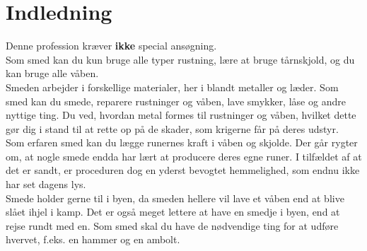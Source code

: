 
\chapter*{Indledning}

Denne profession kræver \textbf{ikke} special ansøgning.\\
Som smed kan du kun bruge alle typer rustning, lære at bruge tårnskjold, og du kan bruge alle våben.\\

Smeden arbejder i forskellige materialer, her i blandt metaller og læder. Som smed kan du smede, reparere rustninger og våben, lave smykker, låse og andre nyttige ting. Du ved, hvordan metal formes til rustninger og våben, hvilket dette gør dig i stand til at rette op på de skader, som krigerne får på deres udstyr.\\
Som erfaren smed kan du lægge runernes kraft i våben og skjolde. Der går rygter om, at nogle smede endda har lært at producere deres egne runer. I tilfældet af at det er sandt, er proceduren dog en yderst bevogtet hemmelighed, som endnu ikke har set dagens lys.\\
Smede holder gerne til i byen, da smeden hellere vil lave et våben end at blive slået ihjel i kamp. Det er også meget lettere at have en smedje i byen, end at rejse rundt med en. Som smed skal du have de nødvendige ting for at udføre hvervet, f.eks. en hammer og en ambolt.